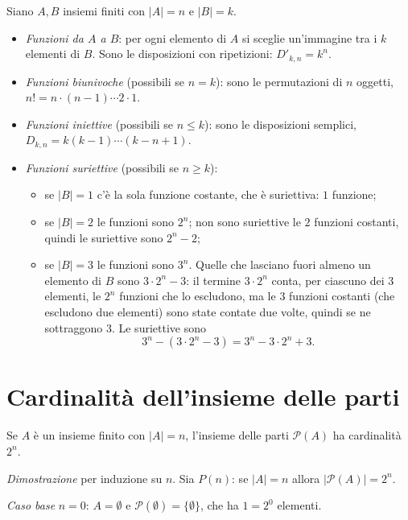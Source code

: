 \documentclass[11pt,a4paper]{article}
\begin{document}
Siano $A, B$ insiemi finiti con $|A| = n$ e $|B| = k$.

\begin{itemize}
    \item \emph{Funzioni da $A$ a $B$}: per ogni elemento di $A$ si sceglie un'immagine tra i $k$ elementi di $B$. Sono le disposizioni con ripetizioni: $D'_{k,n} = k^n$.
    \item \emph{Funzioni biunivoche} (possibili se $n = k$): sono le permutazioni di $n$ oggetti, $n! = n \cdot (n-1) \cdots 2 \cdot 1$.
    \item \emph{Funzioni iniettive} (possibili se $n \le k$): sono le disposizioni semplici, $D_{k,n} = k(k-1)\cdots(k-n+1)$.
    \item \emph{Funzioni suriettive} (possibili se $n \ge k$):
    \begin{itemize}
        \item se $|B| = 1$ c'è la sola funzione costante, che è suriettiva: $1$ funzione;
        \item se $|B| = 2$ le funzioni sono $2^n$; non sono suriettive le $2$ funzioni costanti, quindi le suriettive sono $2^n - 2$;
        \item se $|B| = 3$ le funzioni sono $3^n$. Quelle che lasciano fuori almeno un elemento di $B$ sono $3 \cdot 2^n - 3$: il termine $3 \cdot 2^n$ conta, per ciascuno dei $3$ elementi, le $2^n$ funzioni che lo escludono, ma le $3$ funzioni costanti (che escludono due elementi) sono state contate due volte, quindi se ne sottraggono $3$. Le suriettive sono
        \[
        3^n - (3 \cdot 2^n - 3) = 3^n - 3 \cdot 2^n + 3.
        \]
    \end{itemize}
\end{itemize}

\section{Cardinalità dell'insieme delle parti}

\begin{proposizione}
Se $A$ è un insieme finito con $|A| = n$, l'insieme delle parti $\mathcal{P}(A)$ ha cardinalità $2^n$.
\end{proposizione}

\emph{Dimostrazione} per induzione su $n$. Sia $P(n)$: se $|A| = n$ allora $|\mathcal{P}(A)| = 2^n$.

\emph{Caso base} $n = 0$: $A = \emptyset$ e $\mathcal{P}(\emptyset) = \{\emptyset\}$, che ha $1 = 2^0$ elementi.
\end{document}
